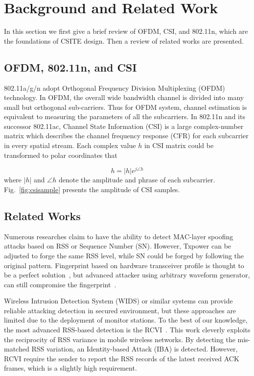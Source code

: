 \documentclass[conference]{IEEEtran}
\begin{document}
\section{Background and Related Work}
\label{sec:related}

In this section we first give a brief review of OFDM, CSI, and 802.11n, which are the foundations of
CSITE design. Then a review of related works are presented.


\subsection{OFDM, 802.11n, and CSI}



802.11a/g/n adopt Orthogonal Frequency Division Multiplexing (OFDM)
technology. In OFDM, the overall wide bandwidth channel is divided
into many small but orthogonal sub-carriers. Thus for OFDM system,
channel estimation is equivalent to measuring the parameters
of all the subcarriers. In 802.11n and its successor 802.11ac, Channel
State Information (CSI) is a large complex-number matrix which describes
the channel frequency response (CFR) for each subcarrier in every spatial stream.
Each complex value $h$ in CSI matrix
could be transformed to polar coordinates that

\begin{equation*}
   h=\left|h\right|{e}^{j\angle h}
\end{equation*}
where $\left|h\right|$ and $\angle h$ denote the amplitude and phrase of each subcarrier. Fig.~\ref{fig:csisample} presents the amplitude of CSI samples.





\subsection{Related Works}

Numerous researches claim to have the ability to detect MAC-layer spoofing attacks based on RSS or Sequence Number (SN).
 However, Txpower can be adjusted to forge the same RSS level,
 while SN could be forged by following the original pattern. Fingerprint
based on hardware transceiver profile is thought to be a perfect
solution~\cite{barbeau2006detecting}, but advanced attacker using
arbitrary waveform generator, can still compromise the
fingerprint~\cite{danev2010attacks}.

Wireless Intrusion Detection System (WIDS) or similar systems \cite{chen2007detecting,sheng2008detecting,
yang2009determining} can provide reliable attacking detection in secured environment, but these approaches are limited due to the deployment of monitor stations.
To the best of our knowledge, the most advanced RSS-based detection is the RCVI~\cite{zeng2011identity}. This work cleverly exploits the reciprocity of RSS variance in mobile wireless networks. By detecting the mis-matched RSS variation, an Identity-based Attack (IBA) is detected. However, RCVI require the sender to report the RSS records of the latest received ACK frames, which is a slightly high requirement.
\end{document}
